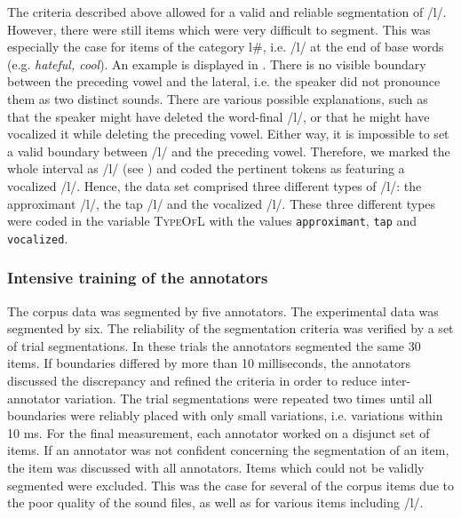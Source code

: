 
The criteria described above allowed for a valid and reliable segmentation of /l/. However, there were still items which were very difficult to segment. This was especially the case for items of the category l\#, i.e. /l/ at the end of base words (e.g. \textit{hateful, cool}). An example is displayed in . There is no visible boundary between the preceding vowel and the lateral, i.e. the speaker did not pronounce them as two distinct sounds. There are various possible explanations, such as that the speaker might have deleted the word-final /l/, or that he might have vocalized it  while deleting the preceding vowel. Either way,  it is impossible to set a valid boundary between /l/ and the preceding vowel. Therefore, we marked the whole interval as /l/ (see ) and coded the pertinent tokens as featuring a vocalized /l/. Hence, the data set comprised three different types of /l/: the approximant /l/, the tap /l/ and the vocalized /l/. These three different types were coded in the variable \textsc{TypeOfL} with the values \texttt{approximant}, \texttt{tap} and \texttt{vocalized}.



\subsubsection{Intensive training of the annotators}

The corpus data was segmented by five annotators. The experimental data was segmented by six. The reliability of the segmentation criteria was verified by a set of trial segmentations.  In these trials the annotators segmented the same 30 items. If boundaries differed by more than 10 milliseconds, the annotators discussed the discrepancy and refined the criteria in order to reduce inter-annotator variation. The trial segmentations were repeated two times until all boundaries were reliably placed with only small variations, i.e. variations within 10 ms. For the final measurement, each annotator worked on a disjunct set of items. If an annotator was not confident concerning the segmentation of an item, the item was discussed with all annotators. Items which could not be validly segmented were excluded. This was the case for several of the corpus items due to the poor quality of the sound files, as well as for various items including /l/. \\%

